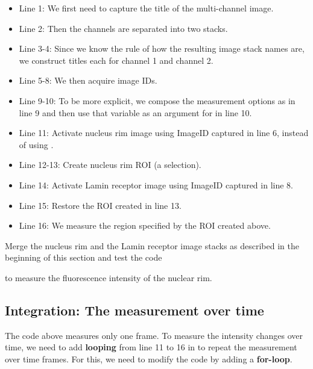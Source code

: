 \begin{itemize}
    \item Line 1: We first need to capture the title of the multi-channel image. 
    \item Line 2: Then the channels are separated into two stacks.
    \item Line 3-4: Since we know the rule of how the resulting image stack names are, we construct titles each for channel 1 and channel 2. 
    \item Line 5-8: We then acquire image IDs.
    \item Line 9-10: To be more explicit, we compose the measurement options as  in line 9 and then use that variable  as an argument for  in line 10.
    \item Line 11: Activate nucleus rim image using ImageID captured in line 6, instead of using .
    \item Line 12-13: Create nucleus rim ROI (a selection).
    \item Line 14: Activate Lamin receptor image using ImageID captured in line 8.
    \item Line 15: Restore the ROI created in line 13.
    \item Line 16: We measure the region specified by the ROI created above.
\end{itemize}

\begin{indentexercise}{3}
Merge the nucleus rim and the Lamin receptor image stacks as described in the beginning of this section and test the code


to measure the fluorescence intensity of the nuclear rim. 
\end{indentexercise}

\subsection{Integration: The measurement over time}

The code above measures only one frame. To measure the intensity changes over time, we need to add \textbf{looping} from line 11 to 16 in  to repeat the measurement over time frames. For this, we need to modify the code by adding a \textbf{for-loop}.



